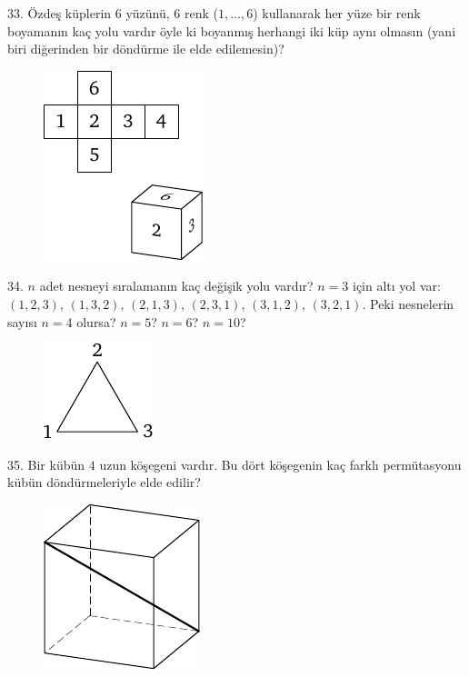 \begin{problem}{33.}
Özdeş küplerin $6$ yüzünü, $6$ renk ($1,\dotsc,6$) kullanarak her yüze bir renk boyamanın kaç yolu vardır öyle ki boyanmış herhangi iki küp aynı olmasın (yani biri diğerinden bir döndürme ile elde edilemesin)?
	\begin{figure}
		\includegraphics{resources/taskbook-17}
	\end{figure}
\end{problem}

\begin{problem}{34.}
$n$ adet nesneyi sıralamanın kaç değişik yolu vardır?
$n=3$ için altı yol var: $(1,2,3)$, $(1,3,2)$, $(2,1,3)$, $(2,3,1)$, $(3,1,2)$, $(3,2,1)$. Peki nesnelerin sayısı $n=4$ olursa? $n=5$? $n=6$? $n=10$?  
	\begin{figure}
		\includegraphics{resources/taskbook-18}
	\end{figure}
\end{problem}

\begin{problem}{35.}
	Bir kübün $4$ uzun köşegeni vardır. Bu dört köşegenin kaç farklı permütasyonu kübün döndürmeleriyle elde edilir?
	\begin{figure}
		\includegraphics{resources/taskbook-19}
	\end{figure}
\end{problem}

